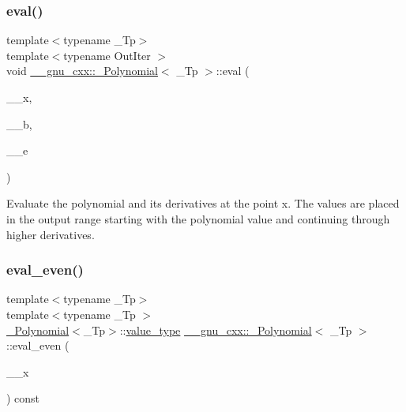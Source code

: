\mbox{\label{class____gnu__cxx_1_1__Polynomial_a409ca632845c145fcf08f8c3e8eeae63}} 
\subsubsection{\texorpdfstring{eval()}{eval()}\hspace{0.1cm}{\footnotesize\ttfamily [4/4]}}
{\footnotesize\ttfamily template$<$typename \+\_\+\+Tp$>$ \\
template$<$typename Out\+Iter $>$ \\
void \hyperlink{class____gnu__cxx_1_1__Polynomial}{\+\_\+\+\_\+gnu\+\_\+cxx\+::\+\_\+\+Polynomial}$<$ \+\_\+\+Tp $>$\+::eval (\begin{DoxyParamCaption}\item[{\hyperlink{class____gnu__cxx_1_1__Polynomial_a725563351f50e76084a7a016c06f8a53}{value\+\_\+type}}]{\+\_\+\+\_\+x,  }\item[{Out\+Iter}]{\+\_\+\+\_\+b,  }\item[{Out\+Iter}]{\+\_\+\+\_\+e }\end{DoxyParamCaption})}

Evaluate the polynomial and its derivatives at the point x. The values are placed in the output range starting with the polynomial value and continuing through higher derivatives. \mbox{\label{class____gnu__cxx_1_1__Polynomial_a5e3d2496522f241c6fae41d222819a59}} 
\subsubsection{\texorpdfstring{eval\+\_\+even()}{eval\_even()}\hspace{0.1cm}{\footnotesize\ttfamily [1/3]}}
{\footnotesize\ttfamily template$<$typename \+\_\+\+Tp$>$ \\
template$<$typename \+\_\+\+Tp $>$ \\
\hyperlink{class____gnu__cxx_1_1__Polynomial}{\+\_\+\+Polynomial}$<$\+\_\+\+Tp$>$\+::\hyperlink{class____gnu__cxx_1_1__Polynomial_a725563351f50e76084a7a016c06f8a53}{value\+\_\+type} \hyperlink{class____gnu__cxx_1_1__Polynomial}{\+\_\+\+\_\+gnu\+\_\+cxx\+::\+\_\+\+Polynomial}$<$ \+\_\+\+Tp $>$\+::eval\+\_\+even (\begin{DoxyParamCaption}\item[{typename \hyperlink{class____gnu__cxx_1_1__Polynomial}{\+\_\+\+Polynomial}$<$ \+\_\+\+Tp $>$\+::\hyperlink{class____gnu__cxx_1_1__Polynomial_a725563351f50e76084a7a016c06f8a53}{value\+\_\+type}}]{\+\_\+\+\_\+x }\end{DoxyParamCaption}) const}

